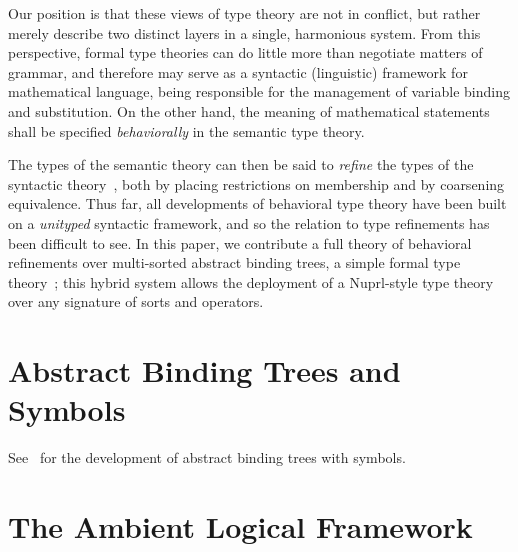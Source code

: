 \documentclass[11pt]{article}
\newif\ifcolored%
\theoremstyle{definition}
\theoremstyle{remark}
\numberwithin{equation}{section}
\def\IModeColorName{MidnightBlue}
\def\OModeColorName{Maroon}
\def\IModeColorName{Black}
\def\OModeColorName{Black}
\newcommand\IMode[1]{{\color{\IModeColorName}{#1}}}
\newcommand\OMode[1]{{\color{\OModeColorName}{#1}}}
\begin{document}
Our position is that these views of type theory are not in conflict, but rather
merely describe two distinct layers in a single, harmonious system. From this
perspective, formal type theories can do little more than negotiate matters of
grammar, and therefore may serve as a syntactic (linguistic) framework
for mathematical language, being responsible for the management of variable
binding and substitution. On the other hand, the meaning of mathematical
statements shall be specified \emph{behaviorally} in the semantic type
theory.

The types of the semantic theory can then be said to \emph{refine} the types of
the syntactic theory~\cite{harper-davies:2014, harper-duff:2015, harper:2016},
both by placing restrictions on membership and by coarsening equivalence. Thus
far, all developments of behavioral type theory have been built on a
\emph{unityped} syntactic framework, and so the relation to type refinements
has been difficult to see. In this paper, we contribute a full theory of
behavioral refinements over multi-sorted abstract binding trees, a simple
formal type theory~\cite{harper:2016, sterling-morrison:2015}; this hybrid
system allows the deployment of a Nuprl-style type theory over any signature of
sorts and operators.

\section{Abstract Binding Trees and Symbols}

See~\cite{sterling-morrison:2015} for the development of abstract binding trees
with symbols. 

\section{The Ambient Logical Framework}

\ifcolored%
In this paper, we hint at the \emph{modes} of judgments and
assertions~\cite{harper:2016} using colors, marking inputs with
$\IMode{\texttt{blue}}$ and outputs with $\OMode{\texttt{red}}$. As a rule of
thumb, inputs are things which are supplied when checking the correctness of a
judgment, and outputs are things which are synthesized in the process. \fi
\end{document}
